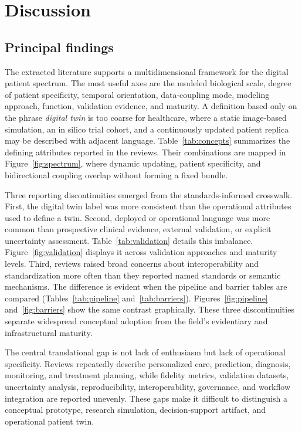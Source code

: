 \section{Discussion}

\subsection{Principal findings}

The extracted literature supports a multidimensional framework for the digital patient spectrum. The most useful axes are the modeled biological scale, degree of patient specificity, temporal orientation, data-coupling mode, modeling approach, function, validation evidence, and maturity. A definition based only on the phrase \emph{digital twin} is too coarse for healthcare, where a static image-based simulation, an in silico trial cohort, and a continuously updated patient replica may be described with adjacent language. Table~\ref{tab:concepts} summarizes the defining attributes reported in the reviews. Their combinations are mapped in Figure~\ref{fig:spectrum}, where dynamic updating, patient specificity, and bidirectional coupling overlap without forming a fixed bundle.

Three reporting discontinuities emerged from the standards-informed crosswalk. First, the digital twin label was more consistent than the operational attributes used to define a twin. Second, deployed or operational language was more common than prospective clinical evidence, external validation, or explicit uncertainty assessment. Table~\ref{tab:validation} details this imbalance. Figure~\ref{fig:validation} displays it across validation approaches and maturity levels. Third, reviews raised broad concerns about interoperability and standardization more often than they reported named standards or semantic mechanisms. The difference is evident when the pipeline and barrier tables are compared (Tables~\ref{tab:pipeline} and~\ref{tab:barriers}). Figures~\ref{fig:pipeline} and~\ref{fig:barriers} show the same contrast graphically. These three discontinuities separate widespread conceptual adoption from the field's evidentiary and infrastructural maturity.

The central translational gap is not lack of enthusiasm but lack of operational specificity. Reviews repeatedly describe personalized care, prediction, diagnosis, monitoring, and treatment planning, while fidelity metrics, validation datasets, uncertainty analysis, reproducibility, interoperability, governance, and workflow integration are reported unevenly. These gaps make it difficult to distinguish a conceptual prototype, research simulation, decision-support artifact, and operational patient twin.

